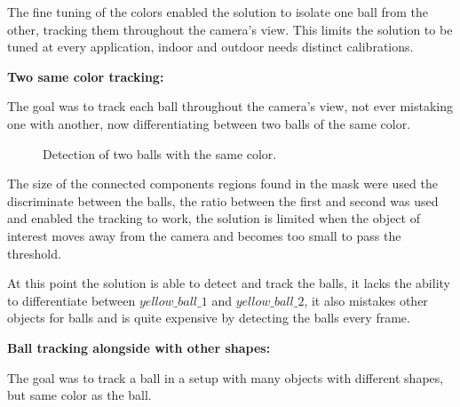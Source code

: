 \documentclass[10pt,twocolumn,letterpaper]{article}
\begin{document}
The fine tuning of the colors enabled the solution to isolate one ball from
the other, tracking them throughout the camera's view. This limits the
solution to be tuned at every application, indoor  and outdoor needs
distinct calibrations.

\bigbreak{}
\textbf{Two same color tracking:}
\bigbreak{}

The goal was to track each ball throughout the camera's view, not ever
mistaking one with another, now differentiating between two balls of the same
color.

\begin{figure}[!h]
\centering
\setlength{\fboxsep}{1pt}
\setlength{\fboxrule}{1pt}
\caption{Detection of two balls with the same color.}\label{fig:same_color}
\end{figure}

The size of the connected components regions found in the mask were used the
discriminate between the balls, the ratio between the first and second was
used and enabled the tracking to work, the solution is limited when the object
of interest moves away from the camera and becomes too small to pass the
threshold.

At this point the solution is able to detect and track the balls, it lacks the
ability to differentiate between $yellow\_ball\_1$ and $yellow\_ball\_2$, it
also mistakes other objects for balls and is quite expensive by detecting the
balls every frame.

\bigbreak{}
\textbf{Ball tracking alongside with other shapes:}
\bigbreak{}

The goal was to track a ball in a setup with many objects with different
shapes, but same color as the ball.
\end{document}
